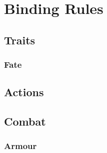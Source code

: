 \documentclass[a4paper,openany]{book}
\date{\today}
\begin{document}
\frontmatter

\section*{Binding Rules}

\physicalSkillChart

\mentalSkillChart

\begin{multicols}{2}

\subsection*{Traits}





\subsubsection*{Fate}


\subsubsection*{}




\subsection*{Actions}








\subsection*{Combat}





\commonWeaponsChart

\subsubsection*{Armour}




\end{multicols}
\end{document}
